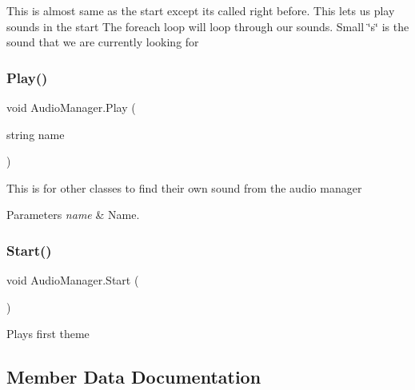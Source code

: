 This is almost same as the start except it\textquotesingle{}s called right before. This let\textquotesingle{}s us play sounds in the start The foreach loop will loop through our sounds. Small \char`\"{}s\char`\"{} is the sound that we are currently looking for 

\mbox{\label{class_audio_manager_a51d560f729b1fd4d6b5ce83ca558deb2}} 
\subsubsection{\texorpdfstring{Play()}{Play()}}
{\footnotesize\ttfamily void Audio\+Manager.\+Play (\begin{DoxyParamCaption}\item[{string}]{name }\end{DoxyParamCaption})}



This is for other classes to find their own sound from the audio manager 


\begin{DoxyParams}{Parameters}
{\em name} & Name.\\
\hline
\end{DoxyParams}
\mbox{\label{class_audio_manager_ab333270dca5bf5c039de3d70ca111ba9}} 
\subsubsection{\texorpdfstring{Start()}{Start()}}
{\footnotesize\ttfamily void Audio\+Manager.\+Start (\begin{DoxyParamCaption}{ }\end{DoxyParamCaption})\hspace{0.3cm}{\ttfamily [private]}}



Plays first theme 



\subsection{Member Data Documentation}
\mbox{\label{class_audio_manager_a66e04092f8cca2c8432893159a08ea56}} 
